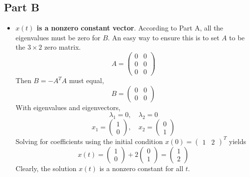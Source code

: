 \documentclass{article}
\begin{document}
\subsection*{Part B}

\begin{itemize}

  \item {\bf $x(t)$ is a nonzero constant vector}. According to Part A, all
  the eigenvalues must be zero for $B$. An easy way to ensure this is to set
  $A$ to be the $3 \times 2$ zero matrix. 
  $$ A = \begin{pmatrix}
    0 & 0 \\
    0 & 0 \\
    0 & 0
  \end{pmatrix} $$
  Then $B = -A^T A$ must equal,
  $$ B = \begin{pmatrix}
    0 & 0 \\
    0 & 0
  \end{pmatrix} $$
  With eigenvalues and eigenvectors,
  $$ \lambda_1 = 0,\quad \lambda_2 = 0 $$
  $$ x_1 = \begin{pmatrix}
    1 \\
    0
  \end{pmatrix},\quad x_2 = \begin{pmatrix}
    0 \\
    1
  \end{pmatrix} $$
  Solving for coefficients using the initial condition $x(0) =
  \begin{pmatrix} 1 & 2 \end{pmatrix}^T$ yields
  $$ x(t) = \begin{pmatrix}
    1 \\
    0
  \end{pmatrix} + 2 \begin{pmatrix}
    0 \\
    1
  \end{pmatrix} = \begin{pmatrix}
    1 \\
    2
  \end{pmatrix} $$
  Clearly, the solution $x(t)$ is a nonzero constant for all $t$.


\end{itemize}
\end{document}
